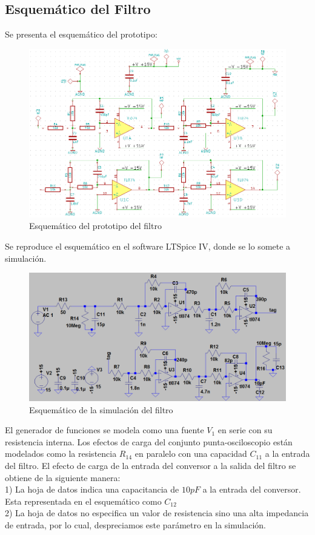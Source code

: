 \documentclass[12pt,a4paper]{article}
\begin{document}
\subsection{Esquemático del Filtro}

Se presenta el esquemático del prototipo:
 
\begin{figure}[H]
\centering
\includegraphics[width=\textwidth]{img/protodrake.png}
\caption{Esquemático del prototipo del filtro}
\end{figure}

Se reproduce el esquemático en el software LTSpice IV, donde se lo somete a simulación.

\begin{figure}[H]
\centering
\includegraphics[width=\textwidth]{img/filtro4.png}
\caption{Esquemático de la simulación del filtro}
\end{figure}

El generador de funciones se modela como una fuente $V_1$ en serie con su resistencia interna.
Los efectos de carga del conjunto punta-osciloscopio están modelados como la resistencia $R_{14}$ en paralelo con una capacidad $C_{11}$ a la entrada del filtro.
El efecto de carga de la entrada del conversor a la salida del filtro se obtiene de la siguiente manera:\\
1) La hoja de datos indica una capacitancia de $10pF$ a la entrada del conversor. Esta representada en el esquemático como $C_{12}$\\
2) La hoja de datos no especifica un valor de resistencia sino una alta impedancia de entrada, por lo cual, despreciamos este parámetro en la simulación.
\end{document}
